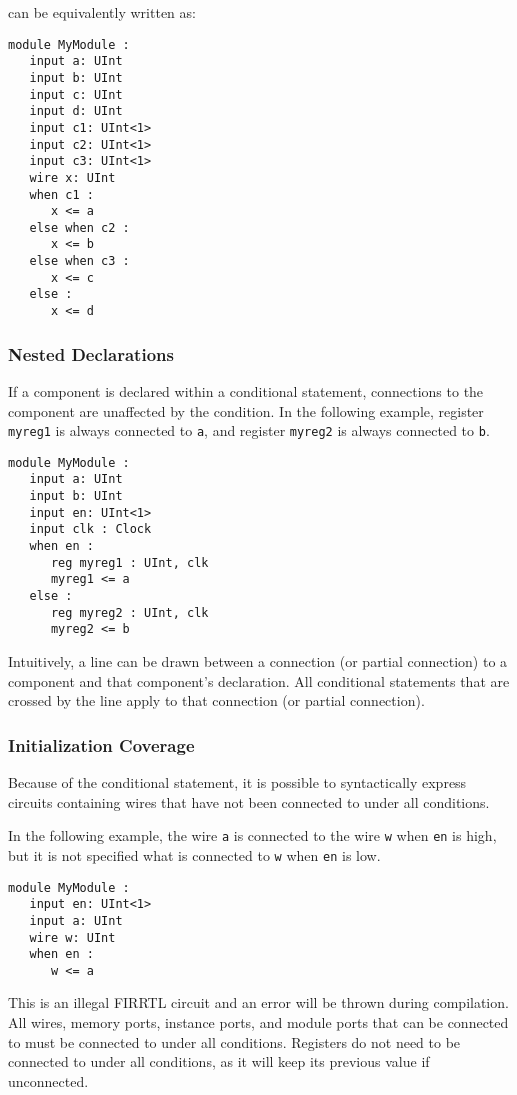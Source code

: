 \documentclass[12pt]{article}
\begin{document}
can be equivalently written as:

\begin{lstlisting}
module MyModule :
   input a: UInt
   input b: UInt
   input c: UInt
   input d: UInt
   input c1: UInt<1>
   input c2: UInt<1>
   input c3: UInt<1>
   wire x: UInt
   when c1 :
      x <= a
   else when c2 :
      x <= b
   else when c3 :
      x <= c  
   else :
      x <= d       
\end{lstlisting}

\subsubsection{Nested Declarations}
If a component is declared within a conditional statement, connections to the component are unaffected by the condition. In the following example, register \verb|myreg1| is always connected to \verb|a|, and register \verb|myreg2| is always connected to \verb|b|.

\begin{lstlisting}
module MyModule :
   input a: UInt
   input b: UInt
   input en: UInt<1>
   input clk : Clock
   when en :
      reg myreg1 : UInt, clk
      myreg1 <= a
   else :
      reg myreg2 : UInt, clk
      myreg2 <= b
\end{lstlisting}

Intuitively, a line can be drawn between a connection (or partial connection) to a component and that component's declaration. All conditional statements that are crossed by the line apply to that connection (or partial connection).

\subsubsection{Initialization Coverage}
Because of the conditional statement, it is possible to syntactically express circuits containing wires that have not been connected to under all conditions.

In the following example, the wire \verb|a| is connected to the wire \verb|w| when \verb|en| is high, but it is not specified what is connected to \verb|w| when \verb|en| is low.

\begin{lstlisting}
module MyModule :
   input en: UInt<1>   
   input a: UInt
   wire w: UInt
   when en :
      w <= a
\end{lstlisting}

This is an illegal FIRRTL circuit and an error will be thrown during compilation. All wires, memory ports, instance ports, and module ports that can be connected to must be connected to under all conditions. Registers do not need to be connected to under all conditions, as it will keep its previous value if unconnected.
\end{document}
